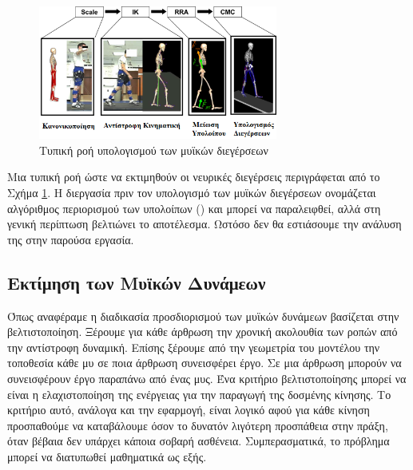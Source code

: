 \begin{figure}[H]
    \centering
    \includegraphics[width=0.7\textwidth, keepaspectratio]{fig/ik-to-excitation.png}
    \caption{Τυπική ροή υπολογισμού των μυϊκών διεγέρσεων\protect\footnotemark}
    \label{fig:ik-to-excitation}
\end{figure}

Μια τυπική ροή ώστε να εκτιμηθούν οι νευρικές διεγέρσεις περιγράφεται από το Σχήμα \ref{fig:ik-to-excitation}. Η διεργασία πριν τον υπολογισμό των μυϊκών διεγέρσεων ονομάζεται αλγόριθμος περιορισμού των υπολοίπων () και μπορεί να παραλειφθεί, αλλά στη γενική περίπτωση βελτιώνει το αποτέλεσμα. Ωστόσο δεν θα εστιάσουμε την ανάλυση της στην παρούσα εργασία.

\subsection{Εκτίμηση των Μυϊκών Δυνάμεων}

Όπως αναφέραμε η διαδικασία προσδιορισμού των μυϊκών δυνάμεων βασίζεται στην βελτιστοποίηση. Ξέρουμε για κάθε άρθρωση την χρονική ακολουθία των ροπών από την αντίστροφη δυναμική. Επίσης ξέρουμε από την γεωμετρία του μοντέλου την τοποθεσία κάθε μυ σε ποια άρθρωση συνεισφέρει έργο. Σε μια άρθρωση μπορούν να συνεισφέρουν έργο παραπάνω από ένας μυς. Ένα κριτήριο βελτιστοποίησης μπορεί να είναι η ελαχιστοποίηση της ενέργειας για την παραγωγή της δοσμένης κίνησης. Το κριτήριο αυτό, ανάλογα και την εφαρμογή, είναι λογικό αφού για κάθε κίνηση προσπαθούμε να καταβάλουμε όσον το δυνατόν λιγότερη προσπάθεια στην πράξη, όταν βέβαια δεν υπάρχει κάποια σοβαρή ασθένεια. Συμπερασματικά, το πρόβλημα μπορεί να διατυπωθεί μαθηματικά ως εξής.\\

